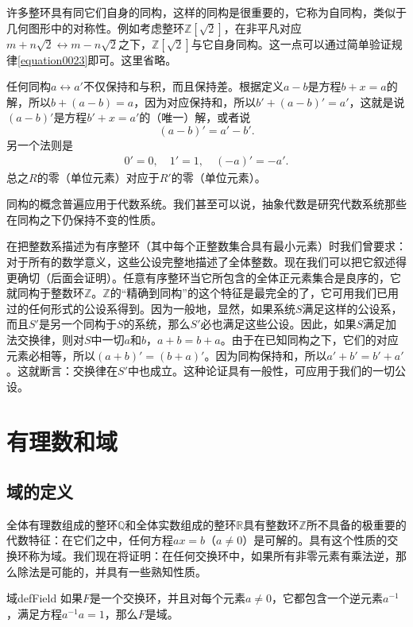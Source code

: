 许多整环具有同它们自身的同构，这样的同构是很重要的，它称为自同构，类似于几何图形中的对称性。例如考虑整环$\mathbb{Z}[\sqrt{2}]$，在非平凡对应$m+n\sqrt{2} \leftrightarrow m-n\sqrt{2}$之下，$\mathbb{Z}[\sqrt{2}]$与它自身同构。这一点可以通过简单验证规律\ref{equation0023}即可。这里省略。

任何同构$a \leftrightarrow a'$不仅保持和与积，而且保持差。根据定义$a-b$是方程$b+x=a$的解，所以$b + (a-b) = a$，因为对应保持和，所以$b'+(a-b)'=a'$，这就是说$(a-b)'$是方程$b'+x=a'$的（唯一）解，或者说
\[
(a-b)' = a'-b'.
\]
另一个法则是
\begin{gather}\label{equation0024}
0'=0,\quad 1'=1, \quad (-a)'=-a'.
\end{gather}
总之$R$的零（单位元素）对应于$R'$的零（单位元素）。

同构的概念普遍应用于代数系统。我们甚至可以说，抽象代数是研究代数系统那些在同构之下仍保持不变的性质。

在把整数系描述为有序整环（其中每个正整数集合具有最小元素）时我们曾要求：对于所有的数学意义，这些公设完整地描述了全体整数。现在我们可以把它叙述得更确切（后面会证明）。任意有序整环当它所包含的全体正元素集合是良序的，它就同构于整数环$\mathbb{Z}$。$\mathbb{Z}$的“精确到同构”的这个特征是最完全的了，它可用我们已用过的任何形式的公设系得到。因为一般地，显然，如果系统$S$满足这样的公设系，而且$S'$是另一个同构于$S$的系统，那么$S'$必也满足这些公设。因此，如果$S$满足加法交换律，则对$S$中一切$a$和$b$，$a+b=b+a$。由于在已知同构之下，它们的对应元素必相等，所以$(a+b)'= (b+a)'$。因为同构保持和，所以$a'+b'= b'+a'$。这就断言：交换律在$S'$中也成立。这种论证具有一般性，可应用于我们的一切公设。

\section{有理数和域}
\subsection{域的定义}
全体有理数组成的整环$\mathbb{Q}$和全体实数组成的整环$\mathbb{R}$具有整数环$\mathbb{Z}$所不具备的极重要的代数特征：在它们之中，任何方程$ax=b$（$a \neq 0$）是可解的。具有这个性质的交换环称为域。我们现在将证明：在任何交换环中，如果所有非零元素有乘法逆，那么除法是可能的，并具有一些熟知性质。
\begin{definition}{域}{defField}
如果$F$是一个交换环，并且对每个元素$a \neq 0$，它都包含一个逆元素$a^{-1}$，满足方程$a^{-1}a=1$，那么$F$是域。
\end{definition}

